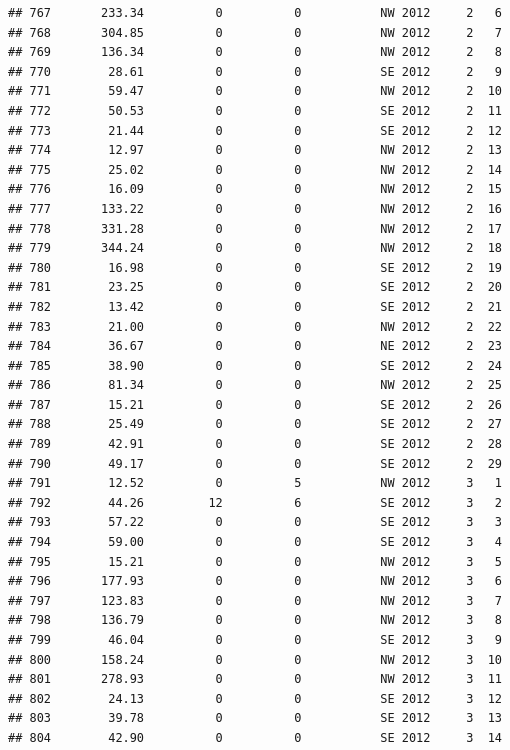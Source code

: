 \documentclass[
]{article}
\begin{document}
\begin{verbatim}
## 767       233.34          0          0           NW 2012     2   6
## 768       304.85          0          0           NW 2012     2   7
## 769       136.34          0          0           NW 2012     2   8
## 770        28.61          0          0           SE 2012     2   9
## 771        59.47          0          0           NW 2012     2  10
## 772        50.53          0          0           SE 2012     2  11
## 773        21.44          0          0           SE 2012     2  12
## 774        12.97          0          0           NW 2012     2  13
## 775        25.02          0          0           NW 2012     2  14
## 776        16.09          0          0           NW 2012     2  15
## 777       133.22          0          0           NW 2012     2  16
## 778       331.28          0          0           NW 2012     2  17
## 779       344.24          0          0           NW 2012     2  18
## 780        16.98          0          0           SE 2012     2  19
## 781        23.25          0          0           SE 2012     2  20
## 782        13.42          0          0           SE 2012     2  21
## 783        21.00          0          0           NW 2012     2  22
## 784        36.67          0          0           NE 2012     2  23
## 785        38.90          0          0           SE 2012     2  24
## 786        81.34          0          0           NW 2012     2  25
## 787        15.21          0          0           SE 2012     2  26
## 788        25.49          0          0           SE 2012     2  27
## 789        42.91          0          0           SE 2012     2  28
## 790        49.17          0          0           SE 2012     2  29
## 791        12.52          0          5           NW 2012     3   1
## 792        44.26         12          6           SE 2012     3   2
## 793        57.22          0          0           SE 2012     3   3
## 794        59.00          0          0           SE 2012     3   4
## 795        15.21          0          0           NW 2012     3   5
## 796       177.93          0          0           NW 2012     3   6
## 797       123.83          0          0           NW 2012     3   7
## 798       136.79          0          0           NW 2012     3   8
## 799        46.04          0          0           SE 2012     3   9
## 800       158.24          0          0           NW 2012     3  10
## 801       278.93          0          0           NW 2012     3  11
## 802        24.13          0          0           SE 2012     3  12
## 803        39.78          0          0           SE 2012     3  13
## 804        42.90          0          0           SE 2012     3  14

\end{verbatim}
\end{document}
